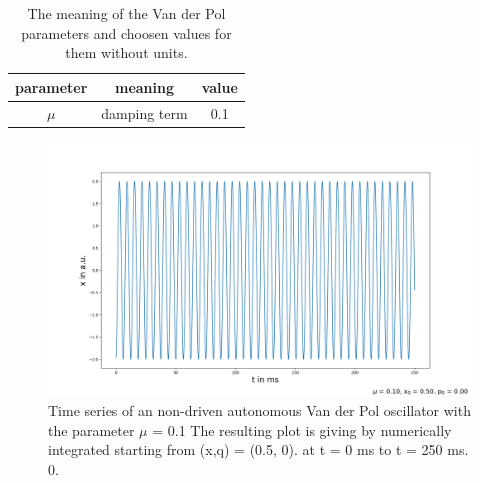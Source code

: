 \documentclass[oneside,10pt,a4paper]{report}
\begin{document}
			\begin{table}[H]
			\centering
			\caption{The meaning of the Van der Pol parameters and choosen values for them without units.}
			\label{tab: vdp_ungetriebene_parameter}
			\begin{tabular}{c c c}
				\toprule
				parameter & meaning & value\\
				\midrule
				$\mu$ & damping term & 0.1\\
				\bottomrule
			\end{tabular}
		\end{table}
		
			\begin{figure}[H]
			\centering
			\includegraphics[scale=0.4]{vdp_unforced_x.png}
			\caption{Time series of an non-driven autonomous Van der Pol oscillator with the parameter $\mu$ = 0.1 The resulting plot is giving by numerically integrated starting from (x,q) = (0.5, 0)\cite{Nonlinear_Dynamic_and_chaos_book}. at t = 0 ms to t = 250 ms. 0.}
			\label{fig: vdp_unforced_x}
		\end{figure}
		
		
\end{document}
